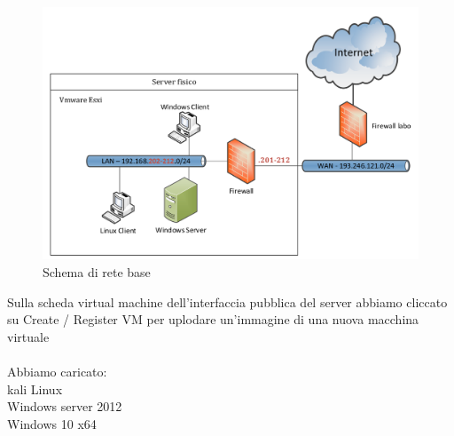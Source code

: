 \documentclass{article}
\begin{document}
\begin{figure}[H]
    \center
    \includegraphics[scale=0.3]{images/s2.png}
    \caption{Schema di rete base}\label{fig:1}
\end{figure}

Sulla scheda virtual machine dell'interfaccia pubblica del server abbiamo cliccato su Create / Register VM
per uplodare un'immagine di una nuova macchina virtuale \\ \\
Abbiamo caricato: \\
kali Linux  \\
Windows server 2012 \\
Windows 10 x64 \\
\end{document}
